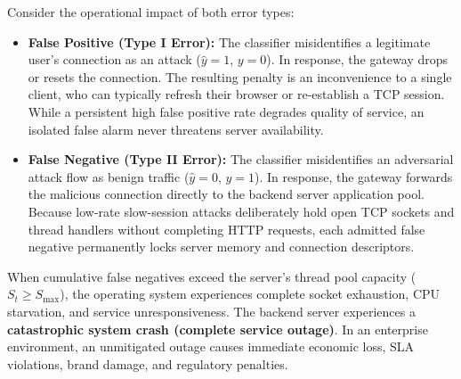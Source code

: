\documentclass[12pt,a4paper,oneside]{report}
\begin{document}
Consider the operational impact of both error types:
\begin{itemize}
    \item \textbf{False Positive (Type I Error):} The classifier misidentifies a legitimate user's connection as an attack ($\hat{y} = 1$, $y = 0$). In response, the gateway drops or resets the connection. The resulting penalty is an inconvenience to a single client, who can typically refresh their browser or re-establish a TCP session. While a persistent high false positive rate degrades quality of service, an isolated false alarm never threatens server availability.
    
    \item \textbf{False Negative (Type II Error):} The classifier misidentifies an adversarial attack flow as benign traffic ($\hat{y} = 0$, $y = 1$). In response, the gateway forwards the malicious connection directly to the backend server application pool. Because low-rate slow-session attacks deliberately hold open TCP sockets and thread handlers without completing HTTP requests, each admitted false negative permanently locks server memory and connection descriptors.
\end{itemize}

When cumulative false negatives exceed the server's thread pool capacity ($S_t \ge S_{\max}$), the operating system experiences complete socket exhaustion, CPU starvation, and service unresponsiveness. The backend server experiences a \textbf{catastrophic system crash (complete service outage)}. In an enterprise environment, an unmitigated outage causes immediate economic loss, SLA violations, brand damage, and regulatory penalties.
\end{document}
